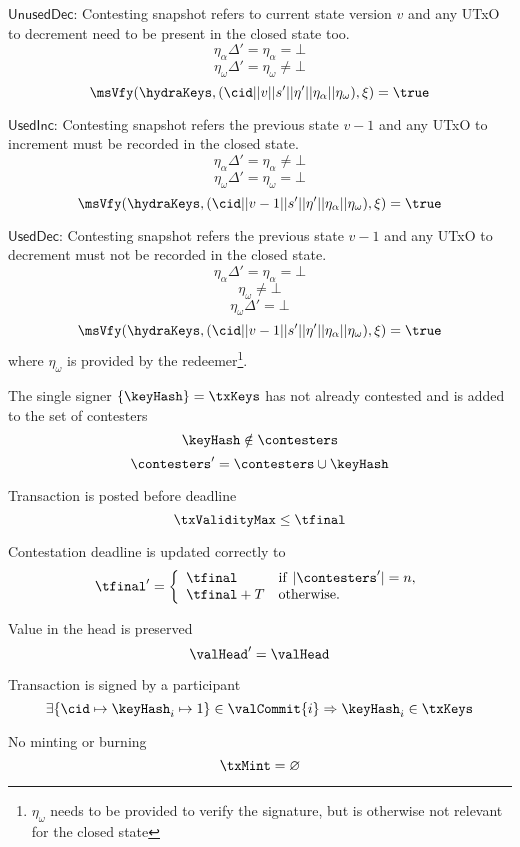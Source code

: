 \begin{menumerate}
\begin{menumerate}
	\item $\mathsf{UnusedDec}$: Contesting snapshot refers to current state version $v$ and any UTxO to decrement need to be present in the closed state too.
	\[
	  \eta_\alpha\Delta' = \eta_\alpha = \bot
	\]
	\[
	  \eta_\omega\Delta' = \eta_\omega \neq \bot
	\]
	\[
	  \msVfy(\hydraKeys,(\cid || v || s' || \eta' || \eta_\alpha|| \eta_\omega),\xi) = \true
	\]
	  \item $\mathsf{UsedInc}$: Contesting snapshot refers the previous state $v - 1$ and any UTxO to increment must be recorded in the closed state.
	  \[
		\eta_\alpha\Delta' = \eta_\alpha \neq \bot
	  \]
	  \[
	    \eta_\omega\Delta' = \eta_\omega = \bot
	  \]
	  \[
		\msVfy(\hydraKeys,(\cid || v - 1 || s' || \eta' || \eta_\alpha || \eta_\omega ),\xi) = \true
	  \]

	\item $\mathsf{UsedDec}$: Contesting snapshot refers the previous state $v - 1$ and any UTxO to decrement must not be recorded in the closed state.
	  \[
		\eta_\alpha\Delta' = \eta_\alpha = \bot
	  \]
	  \[ 
	    \eta_\omega \neq  \bot
	  \]
	  \[ 
	    \eta_\omega\Delta' = \bot
	  \]
	\[
	  \msVfy(\hydraKeys,(\cid || v - 1 || s' || \eta' || \eta_\alpha|| \eta_\omega),\xi) = \true
	\]
	where $\eta_\omega$ is provided by the redeemer\footnote{$\eta_\omega$ needs to be provided to verify the signature, but is otherwise not relevant for the closed state}.
  \end{menumerate}

  \item The single signer $\{\keyHash\} = \txKeys$ has not already contested and is added to the set of contesters
  \[
	\keyHash \notin \contesters
  \]
  \[
	\contesters' = \contesters \cup \keyHash
  \]
  \item Transaction is posted before deadline
  \[
	\txValidityMax \leq \tfinal
  \]
  \item Contestation deadline is updated correctly to
  \[
	\tfinal' = \left\{\begin{array}{ll}
	  \tfinal     & \mathrm{if} ~ |\contesters'| = n, \\
	  \tfinal + T & \mathrm{otherwise.}
	\end{array}\right.
\]
\item Value in the head is preserved
\[
  \valHead' = \valHead
\]
\item Transaction is signed by a participant
\[
  \exists \{\cid \mapsto \keyHash_{i} \mapsto 1\} \in \valCommit{i} \Rightarrow \keyHash_{i} \in \txKeys
\]
\item No minting or burning
\[
  \txMint = \varnothing
\]
\end{menumerate}

